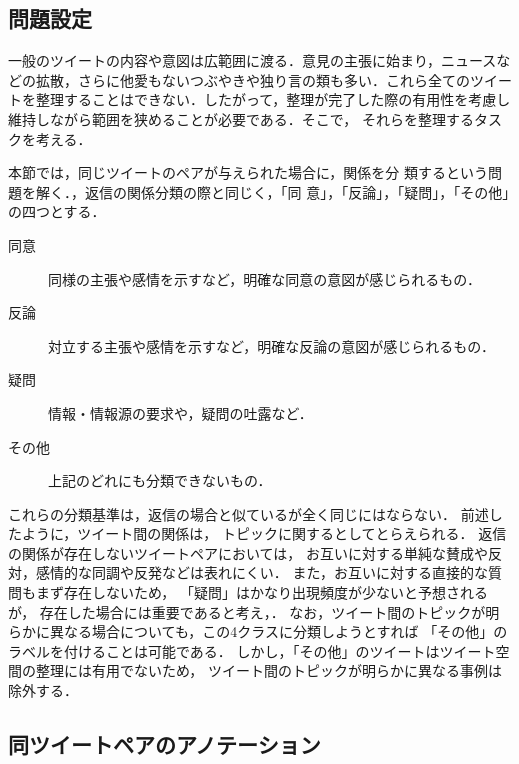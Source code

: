 \documentclass[japanese]{jnlp_1.4}
\newcommand{\addspan}[1]{}
\begin{document}
\subsection{問題設定}

一般のツイートの内容や意図は広範囲に渡る．意見の主張に始まり，ニュースな
どの拡散，さらに他愛もないつぶやきや独り言の類も多い．これら全てのツイー
トを整理することはできない．したがって，整理が完了した際の有用性を考慮し
維持しながら範囲を狭めることが必要である．そこで，
\addspan{\ref{sec:classification_setting}節で定義した，トピックに関連する
ツイート群を収拾し，}それらを整理するタスクを考える．\addspan{同じトピッ
クに属するツイート間には，そのトピックに対する同意，反論などの観点から関
係を付与できると考えられる．各ツイートがあるトピックに属するか否かを決定
する手法については，本稿の手法の対象外であり，人手で行う．}

本節では，同じ\addspan{トピックに属する}ツイートのペアが与えられた場合に，関係を分
類するという問題を解く．\addspan{分類する関係は}，返信の関係分類の際と同じく，「同
意」，「反論」，「疑問」，「その他」の四つとする．

\begin{description}
 \item[同意] 同様の主張や感情を示すなど，明確な同意の意図が感じられるもの．
 \item[反論] 対立する主張や感情を示すなど，明確な反論の意図が感じられるもの．
 \item[疑問] 情報・情報源の要求や，疑問の吐露など．
 \item[その他] 上記のどれにも分類できないもの．
\end{description}

これらの分類基準は，返信の場合と似ているが全く同じにはならない．
前述したように，ツイート間の関係は，
トピックに関する\addspan{主張間の関係}としてとらえられる．
返信の関係が存在しないツイートペアにおいては，
お互いに対する単純な賛成や反対，感情的な同調や反発などは表れにくい．
また，お互いに対する直接的な質問もまず存在しないため，
「疑問」はかなり出現頻度が少ないと予想されるが，
存在した場合には重要であると考え，\addspan{分類対象の関係に含める}．
なお，ツイート間のトピックが明らかに異なる場合についても，この4クラスに分類しようとすれば
「その他」のラベルを付けることは可能である．
しかし，「その他」のツイートはツイート空間の整理には有用でないため，
ツイート間のトピックが明らかに異なる事例は除外する．


\subsection{同\addspan{トピック}ツイートペアのアノテーション}
\end{document}
